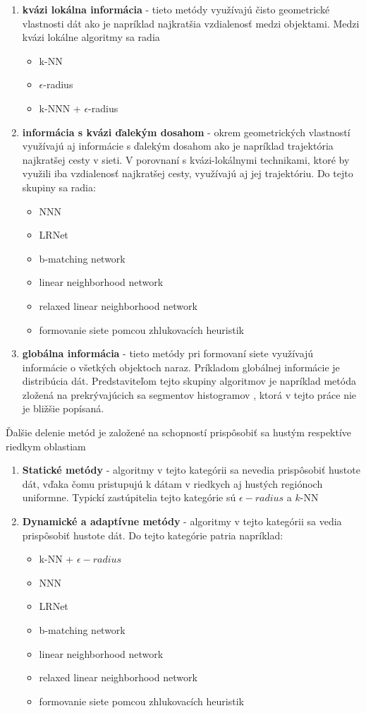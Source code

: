 \documentclass[slovak,master,dept460,male,cpp,cpdeclaration]{diploma}
\begin{document}
\begin{enumerate}
\item \textbf{kvázi lokálna informácia} - tieto metódy využívajú čisto geometrické vlastnosti dát ako je napríklad najkratšia vzdialenosť medzi objektami.
 Medzi kvázi lokálne algoritmy sa radia
\begin{itemize}
\item k-NN
\item $\epsilon$-radius
\item k-NNN + $\epsilon$-radius
\end{itemize}

\item \textbf{informácia s kvázi ďalekým dosahom} - okrem geometrických vlastností využívajú aj informácie s ďalekým dosahom ako je napríklad trajektória najkratšej cesty v sieti. V porovnaní s kvázi-lokálnymi technikami, ktoré by využili iba vzdialenosť najkratšej cesty, využívajú aj jej trajektóriu. Do tejto skupiny sa radia:
\begin{itemize}
\item NNN
\item LRNet
\item b-matching network
\item linear neighborhood network
\item relaxed linear neighborhood network
\item formovanie siete pomcou zhlukovacích heuristik
\end{itemize}

\item \textbf{globálna informácia} - tieto metódy pri formovaní siete využívajú informácie o všetkých objektoch naraz. Príkladom globálnej informácie je distribúcia dát. Predstaviteľom tejto skupiny algoritmov je napríklad metóda zložená na prekrývajúcich sa segmentov  histogramov \cite{histograms_network}, ktorá v tejto práce nie je bližšie popísaná.
\end{enumerate}

Ďalšie delenie metód je založené na schopností prispôsobiť sa hustým respektíve riedkym oblastiam
\begin{enumerate}
\item \textbf{Statické metódy} - algoritmy v tejto kategórii  sa nevedia prispôsobiť hustote dát, vďaka čomu pristupujú k dátam v riedkych aj hustých regiónoch  uniformne. Typickí zastúpitelia  tejto kategórie sú $\epsilon-radius$ a $k$-NN
\item \textbf{Dynamické a adaptívne metódy} - algoritmy v tejto kategórii sa vedia prispôsobiť hustote dát. Do tejto kategórie patria napríklad:
\begin{itemize}
\item  k-NN + $\epsilon-radius$
\item NNN
\item LRNet
\item b-matching network
\item linear neighborhood network
\item relaxed linear neighborhood network
\item formovanie siete pomcou zhlukovacích heuristik
\end{itemize}
\end{enumerate}
\end{document}
